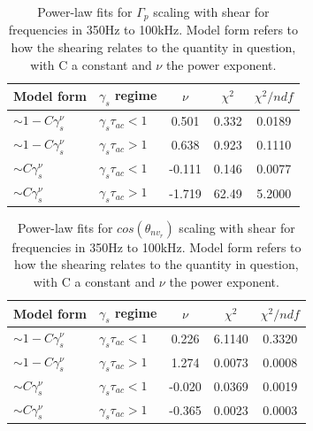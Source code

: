 \documentclass[aip,pop,amsmath,amssymb,reprint,superscriptaddress]{revtex4-1} %
\begin{document}
\begin{table}
\caption{\label{tab:table3}Power-law fits for $\Gamma_{p}$ scaling with shear for frequencies in 350Hz to 100kHz. Model form refers to how the shearing relates to the quantity in question, with C a constant and $\nu$ the power exponent.}
\begin{ruledtabular}
\begin{tabular}{llccc}
Model form&$\gamma_{s}$ regime&$\nu$&$\chi^2$&$\chi^2/ndf$\\
\hline
$\sim 1-C\gamma_{s}^\nu$&$\gamma_{s}\tau_{ac}<1$ &0.501   &0.332    &0.0189\\
$\sim 1-C\gamma_{s}^\nu$&$\gamma_{s}\tau_{ac}>1$ &0.638   &0.923    &0.1110\\
$\sim C\gamma_{s}^\nu$&$\gamma_{s}\tau_{ac}<1$   &-0.111  &0.146    &0.0077\\
$\sim C\gamma_{s}^\nu$&$\gamma_{s}\tau_{ac}>1$   &-1.719  &62.49    &5.2000\\
\end{tabular}
\end{ruledtabular}
\end{table}

\begin{table}
\caption{\label{tab:table4}Power-law fits for $cos(\theta_{nv_{r}})$ scaling with shear for frequencies in 350Hz to 100kHz. Model form refers to how the shearing relates to the quantity in question, with C a constant and $\nu$ the power exponent.}
\begin{ruledtabular}
\begin{tabular}{llccc}
Model form&$\gamma_{s}$ regime&$\nu$&$\chi^2$&$\chi^2/ndf$\\
\hline
$\sim 1-C\gamma_{s}^\nu$&$\gamma_{s}\tau_{ac}<1$ &0.226   &6.1140    &0.3320\\
$\sim 1-C\gamma_{s}^\nu$&$\gamma_{s}\tau_{ac}>1$ &1.274   &0.0073    &0.0008\\
$\sim C\gamma_{s}^\nu$&$\gamma_{s}\tau_{ac}<1$   &-0.020  &0.0369    &0.0019\\
$\sim C\gamma_{s}^\nu$&$\gamma_{s}\tau_{ac}>1$   &-0.365  &0.0023    &0.0003\\
\end{tabular}
\end{ruledtabular}
\end{table}
\end{document}
